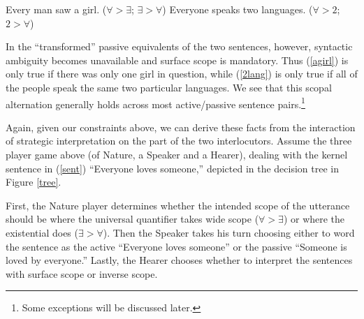 \documentclass{article}
\begin{document}
\begin{exe}
\ex\label{first}{\begin{xlist}
\ex Every man saw a girl. \hfill ($\forall > \exists$; $\exists >  \forall$)\label{evman}
\ex Everyone speaks two languages. \hfill ($\forall > 2$; $2 > \forall$)\label{evsp}
\end{xlist}}
\end{exe}

In the ``transformed'' passive equivalents of the two sentences, however, syntactic ambiguity becomes unavailable and surface scope is mandatory.
Thus (\ref{agirl}) is only true if there was only one girl in question, while (\ref{2lang}) is only true if all of the people speak the same two particular languages.
We see that this scopal alternation generally holds across most active/passive sentence pairs.\footnote{Some exceptions will be discussed later.}

\begin{exe}
\end{exe}

Again, given our constraints above, we can derive these facts from the interaction of strategic interpretation on the part of the two interlocutors. Assume the three player game above (of Nature, a Speaker and a Hearer), dealing with the kernel sentence in (\ref{sent}) ``Everyone loves someone,'' depicted in the decision tree in Figure \ref{tree}.

First, the Nature player determines whether the intended scope of the utterance should be where the universal quantifier takes wide scope ($\forall>\exists$) or where the existential does ($\exists>\forall$). Then the Speaker takes his turn choosing either to word the sentence as the active ``Everyone loves someone'' or the passive ``Someone is loved by everyone.'' Lastly, the Hearer chooses whether to interpret the sentences with surface scope or inverse scope.
\end{document}
